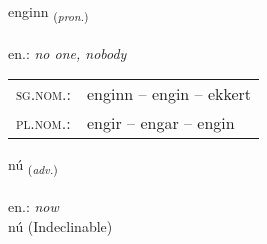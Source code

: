 \documentclass[frontgrid, backgrid]{flacards}\usepackage[]{graphicx}\usepackage[]{xcolor}
\begin{document}
\renewcommand{\flhead}{\vskip5pt \fboxsep=0pt {\small\bfseries\footnotesize Fornafn | Pronoun}}
\renewcommand{\fcfoot}{\vskip5pt \fboxsep=0pt \hspace{2pt}{\small\bfseries\footnotesize 1K}}

\renewcommand{\blhead}{\vskip5pt {\small\bfseries\footnotesize Fornafn | Pronoun }}
\renewcommand{\bcfoot}{\vskip5pt \hspace{2pt}{\small\bfseries\footnotesize 1K}}


{enginn \small{\textsubscript{(\textit{pron.})}} \\[1ex] %
\textphonetic{[eiɲcɪn]} \\
en.: \emph{no one, nobody} \\  [2ex]
\renewcommand*{\arraystretch}{0.8}
\begin{tabular}{ll}
\textsc{sg.nom.}: & enginn  --  engin -- ekkert \\ 
\textsc{pl.nom.}: & engir -- engar -- engin
\end{tabular}
}


\renewcommand{\flhead}{\vskip5pt \fboxsep=0pt {\small\bfseries\footnotesize Atviksorð | Adverb}}
\renewcommand{\fcfoot}{\vskip5pt \fboxsep=0pt \hspace{2pt}{\small\bfseries\footnotesize 1K}}

\renewcommand{\blhead}{\vskip5pt {\small\bfseries\footnotesize Atviksorð | Adverb }}
\renewcommand{\bcfoot}{\vskip5pt \hspace{2pt}{\small\bfseries\footnotesize 1K}}


{nú \small{\textsubscript{(\textit{adv.})}} \\[1ex]
\textphonetic{[nuː]} \\
en.: \emph{now} \\  [2ex]
nú (Indeclinable)}

\renewcommand{\flhead}{\vskip5pt \fboxsep=0pt {\small\bfseries\footnotesize Sagnorð | Verb}}
\renewcommand{\fcfoot}{\vskip5pt \fboxsep=0pt \hspace{2pt}{\small\bfseries\footnotesize 1K}}
\end{document}
